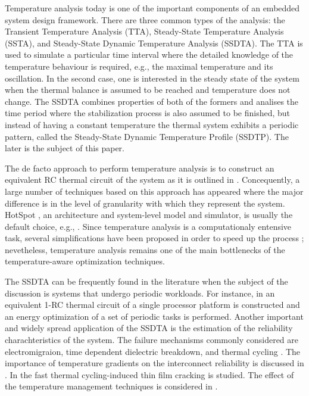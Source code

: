 Temperature analysis today is one of the important components of an embedded system design framework. There are three common types of the analysis: the Transient Temperature Analysis (TTA), Steady-State Temperature Analysis (SSTA), and Steady-State Dynamic Temperature Analysis (SSDTA). The TTA is used to simulate a particular time interval where the detailed knowledge of the temperature behaviour is required, e.g., the maximal temperature and its oscillation. In the second case, one is interested in the steady state of the system when the thermal balance is assumed to be reached and temperature does not change. The SSDTA combines properties of both of the formers and analises the time period where the stabilization process is also assumed to be finished, but instead of having a constant temperature the thermal system exhibits a periodic pattern, called the Steady-State Dynamic Temperature Profile (SSDTP). The later is the subject of this paper.

The de facto approach to perform temperature analysis is to construct an equivalent RC thermal circuit \cite{kreith2000} of the system as it is outlined in . Concequently, a large number of techniques based on this approach has appeared where the major difference is in the level of granularity with which they represent the system. HotSpot \cite{huang2006}, an architecture and system-level model and simulator, is usually the default choice, e.g., \cite{lu2004, srinivasan2004, liao2005, coskun2006, liu2007, huang2009, xiang2010, thiele2011}. Since temperature analysis is a computationaly entensive task, several simplifications have been proposed in order to speed up the process \cite{rao2007, hanumaiah2009}; nevetheless, temperature analysis remains one of the main bottlenecks of the temperature-aware optimization techniques.

The SSDTA can be frequently found in the literature when the subject of the discussion is systems that undergo periodic workloads. For instance, in \cite{bao2010} an equivalent 1-RC thermal circuit of a single processor platform is constructed and an energy optimization of a set of periodic tasks is performed. Another important and widely spread application of the SSDTA is the estimation of the reliability charachteristics of the system. The failure mechanisms commonly considered are electromigraion, time dependent dielectric breakdown, and thermal cycling \cite{jedec2010}. The importance of temperature gradients on the interconnect reliability is discussed in \cite{lu2004}. In \cite{hieu2004} the fast thermal cycling-induced thin film cracking is studied. The effect of the temperature management techniques is considered in \cite{srinivasan2004}.

